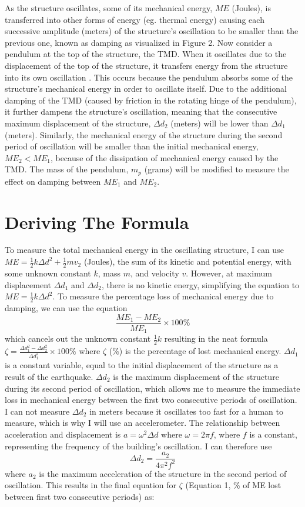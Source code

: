 \documentclass[11pt]{article}
\begin{document}
As the structure oscillates, some of its mechanical energy, $ME$ (Joules), is transferred into other forms of energy (eg. thermal energy) causing each successive amplitude (meters) of the structure’s oscillation to be smaller than the previous one, known as damping as visualized in Figure 2. Now consider a pendulum at the top of the structure, the TMD. When it oscillates due to the displacement of the top of the structure, it transfers energy from the structure into its own oscillation \autocite{connor}. This occurs because the pendulum absorbs some of the structure's mechanical energy in order to oscillate itself. Due to the additional damping of the TMD (caused by friction in the rotating hinge of the pendulum), it further dampens the structure’s oscillation, meaning that the consecutive maximum displacement of the structure, $\Delta d_2$ (meters) will be lower than $\Delta d_1$ (meters). Similarly, the mechanical energy of the structure during the second period of oscillation will be smaller than the initial mechanical energy, $ME_2 < ME_1$, because of the dissipation of mechanical energy caused by the TMD. The mass of the pendulum, $m_p$ (grams) will be modified to measure the effect on damping between $ME_1$ and $ME_2$.

\section{Deriving The Formula}

To measure the total mechanical energy in the oscillating structure, I can use $ME=\frac{1}{2}k\Delta d ^2+\frac{1}{2}mv_2$ (Joules), the sum of its kinetic and potential energy, with some unknown constant $k$, mass $m$, and velocity $v$. However, at maximum displacement $\Delta d_1$ and $\Delta d_2$, there is no kinetic energy, simplifying the equation to $ME=\frac{1}{2}k \Delta d^2$. To measure the percentage loss of mechanical energy due to damping, we can use the equation $$\frac{ME_1-ME_2}{ME_1}\times100\%$$ which cancels out the unknown constant $\frac{1}{2}k$ resulting in the neat formula $\zeta=\frac{\Delta d_1^2-\Delta d_2^2}{\Delta d_1^2}\times100\%$ where $\zeta$ (\%) is the percentage of lost mechanical energy.
$\Delta d_1$ is a constant variable, equal to the initial displacement of the structure as a result of the earthquake. $\Delta d_2$ is the maximum displacement of the structure during its second period of oscillation, which allows me to measure the immediate loss in mechanical energy between the first two consecutive periods of oscillation. I can not measure $\Delta d_2$ in meters because it oscillates too fast for a human to measure, which is why I will use an accelerometer. The relationship between acceleration and displacement is $a=\omega ^2 \Delta d$ where $\omega=2\pi f$, where $f$ is a constant, representing the frequency of the building’s oscillation. I can therefore use $$\Delta d_2=\frac{a_2}{4\pi^2f^2}$$ where $a_2$ is the maximum acceleration of the structure in the second period of oscillation. This results in the final equation for $\zeta$ (Equation 1, \% of ME lost between first two consecutive periods) as: 
\end{document}
